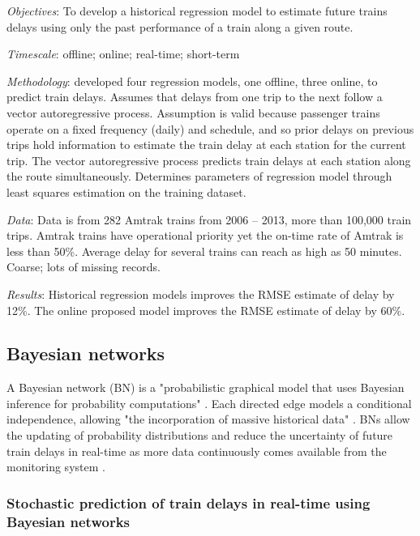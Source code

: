 \documentclass{article}
\begin{document}
\textit{Objectives}: To develop a historical regression model to estimate future trains delays using only the past performance of a train along a given route.

\smallskip

\textit{Timescale}: offline; online; real-time; short-term

\smallskip

\textit{Methodology}: developed four regression models, one offline, three online, to predict train delays. Assumes that delays from one trip to the next follow a vector autoregressive process. Assumption is valid because passenger trains operate on a fixed frequency (daily) and schedule, and so prior delays on previous trips hold information to estimate the train delay at each station for the current trip. The vector autoregressive process predicts train delays at each station along the route simultaneously. Determines parameters of regression model through least squares estimation on the training dataset.

\smallskip

\textit{Data}: Data is from 282 Amtrak trains from 2006 – 2013, more than 100,000 train trips. Amtrak trains have operational priority yet the on-time rate of Amtrak is less than 50\%. Average delay for several trains can reach as high as 50 minutes. Coarse; lots of missing records. 

\smallskip

\textit{Results}: Historical regression models improves the RMSE estimate of delay by 12\%. The online proposed model improves the RMSE estimate of delay by 60\%.

\subsection{Bayesian networks}

A Bayesian network (BN) is a "probabilistic graphical model that uses Bayesian inference for probability computations" \cite{towards_data_science_BN_intro}. Each directed edge models a conditional independence, allowing "the incorporation of massive historical data" \cite{lessan_fu_wen_2019}. BNs allow the updating of probability distributions and reduce the uncertainty of future train delays in real-time as more data continuously comes available from the monitoring system \cite{corman_kecman_2018}.

\subsubsection{Stochastic prediction of train delays in real-time using Bayesian networks \cite{corman_kecman_2018}}
\end{document}
